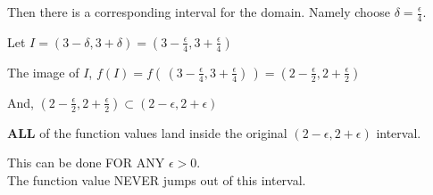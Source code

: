 \documentclass{ximera}
\begin{document}
Then there is a corresponding interval for the domain. Namely choose $\delta = \frac{\epsilon}{4}$.

Let $I = (3 - \delta, 3 + \delta) = \left(3 - \frac{\epsilon}{4}, 3 + \frac{\epsilon}{4}\right)$


The image of $I$, $f(I) = f\left(\,\left(3 - \frac{\epsilon}{4}, 3 + \frac{\epsilon}{4}\right)\,\right) = \left(2 - \frac{\epsilon}{2}, 2 + \frac{\epsilon}{2}\right)$

And, $\left(2 - \frac{\epsilon}{2}, 2 + \frac{\epsilon}{2}\right) \subset  (2 - \epsilon, 2 + \epsilon) $


\textbf{ALL} of the function values land inside the original $(2 - \epsilon, 2 + \epsilon)$ interval.


This can be done FOR ANY $\epsilon > 0$. \\


The function value NEVER jumps out of this interval.
\end{document}
